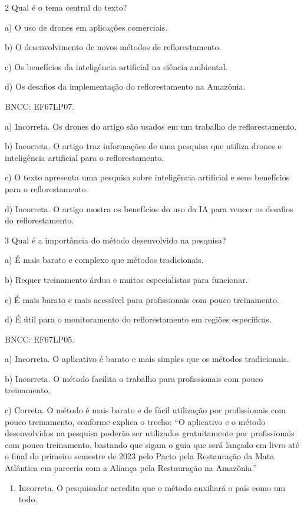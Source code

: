 \num{2} Qual é o tema central do texto?

a) O uso de drones em aplicações comerciais.

b) O desenvolvimento de novos métodos de reflorestamento.

c) Os benefícios da inteligência artificial na ciência ambiental.

d) Os desafios da implementação do reflorestamento na Amazônia.

BNCC: EF67LP07.

a) Incorreta. Os drones do artigo são usados em um trabalho de
reflorestamento.

b) Incorreta. O artigo traz informações de uma pesquisa que utiliza
drones e inteligência artificial para o reflorestamento.

c) O texto apresenta uma pesquisa sobre inteligência artificial e seus
benefícios para o reflorestamento.

d) Incorreta. O artigo mostra os benefícios do uso da IA para vencer os
desafios do reflorestamento.

\num{3} Qual é a importância do método desenvolvido na pesquisa?

a) É mais barato e complexo que métodos tradicionais.

b) Requer treinamento árduo e muitos especialistas para funcionar.

c) É mais barato e mais acessível para profissionais com pouco
treinamento.

d) É útil para o monitoramento do reflorestamento em regiões
específicas.

BNCC: EF67LP05.

a) Incorreta. O aplicativo é barato e mais simples que os métodos
tradicionais.

b) Incorreta. O método facilita o trabalho para profissionais com pouco
treinamento.

c) Correta. O método é mais barato e de fácil utilização por
profissionais com pouco treinamento, conforme explica o trecho: ``O
aplicativo e o método desenvolvidos na pesquisa poderão ser utilizados
gratuitamente por profissionais com pouco treinamento, bastando que
sigam o guia que será lançado em livro até o final do primeiro semestre
de 2023 pelo Pacto pela Restauração da Mata Atlântica em parceria com a
Aliança pela Restauração na Amazônia.''

\begin{enumerate}
\def\labelenumi{\alph{enumi})}
\setcounter{enumi}{3}
\tightlist
\item
  Incorreta. O pesquisador acredita que o método auxiliará o país como
  um todo.
\end{enumerate}

